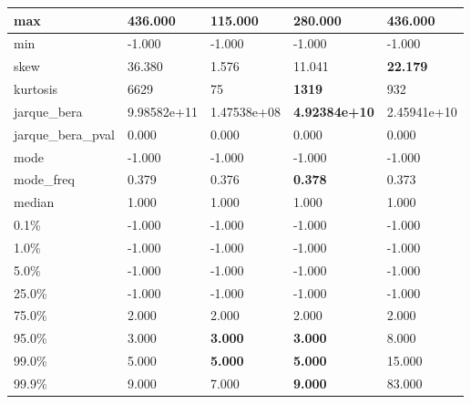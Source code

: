 \begin{table}[H]
\begin{tabular}{|l|m{10em}|m{10em}|m{10em}|m{10em}|}
\hline max & 436.000 & \cellcolor[rgb]{0.9, 0.54, 0.52} 115.000 & 280.000 & \bfseries 436.000 \\
\hline min & -1.000 & -1.000 & -1.000 & -1.000 \\
\hline skew & 36.380 & \cellcolor[rgb]{0.9, 0.54, 0.52} 1.576 & 11.041 & \bfseries 22.179 \\
\hline kurtosis & 6629 & \cellcolor[rgb]{0.9, 0.54, 0.52} 75 & \bfseries 1319 & 932 \\
\hline jarque\_bera & 9.98582e+11 & \cellcolor[rgb]{0.9, 0.54, 0.52} 1.47538e+08 & \bfseries 4.92384e+10 & 2.45941e+10 \\
\hline jarque\_bera\_pval & 0.000 & 0.000 & 0.000 & 0.000 \\
\hline mode & -1.000 & -1.000 & -1.000 & -1.000 \\
\hline mode\_freq & 0.379 & 0.376 & \bfseries 0.378 & \cellcolor[rgb]{0.9, 0.54, 0.52} 0.373 \\
\hline median & 1.000 & 1.000 & 1.000 & 1.000 \\
\hline 0.1\% & -1.000 & -1.000 & -1.000 & -1.000 \\
\hline 1.0\% & -1.000 & -1.000 & -1.000 & -1.000 \\
\hline 5.0\% & -1.000 & -1.000 & -1.000 & -1.000 \\
\hline 25.0\% & -1.000 & -1.000 & -1.000 & -1.000 \\
\hline 75.0\% & 2.000 & 2.000 & 2.000 & 2.000 \\
\hline 95.0\% & 3.000 & \bfseries 3.000 & \bfseries 3.000 & \cellcolor[rgb]{0.9, 0.54, 0.52} 8.000 \\
\hline 99.0\% & 5.000 & \bfseries 5.000 & \bfseries 5.000 & \cellcolor[rgb]{0.9, 0.54, 0.52} 15.000 \\
\hline 99.9\% & 9.000 & 7.000 & \bfseries 9.000 & \cellcolor[rgb]{0.9, 0.54, 0.52} 83.000 \\
\hline
\end{tabular}
\end{table}

